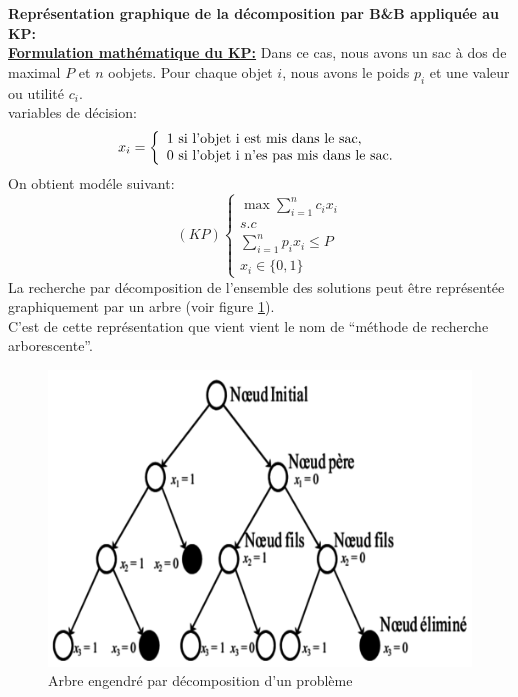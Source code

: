 \documentclass[a4paper,11pt,oneside]{report}
\theoremstyle{plain}
\newcommand{\0}{/ \! \! \! 0}
\theoremstyle{plain}
\begin{document}
  {\bf Repr\'esentation graphique de la d\'ecomposition par B\&B appliqu\'ee au KP:}\\
\underline{\bfseries Formulation math\'ematique du KP:} Dans ce cas, nous avons un sac \`a dos de maximal $P$ et $n$ oobjets. Pour chaque objet $i$, nous avons le poids $p_i$
 et une valeur ou utilit\'e $c_i$.\\
 variables de d\'ecision:
 $$
   x_i = \left \{ \begin{array}{l}
           1 \,\, \textnormal{si l'objet i est mis dans le sac,}\\
           0 \,\, \textnormal{si l'objet i n'es pas mis dans le sac.}
          \end{array}
          \right.
 $$
 On obtient mod\'ele suivant:
 \[
  (KP) \left \{\begin{array}{l}
          \max \displaystyle\sum_{i=1}^n c_i x_i \\
          s.c                        \\
          \displaystyle\sum_{i=1}^n p_i x_i \leq P \\
          x_i \in \{ 0, 1 \}
         \end{array}\right.
 \]
 La recherche par d\'ecomposition de l'ensemble des solutions peut \^etre repr\'esent\'ee graphiquement par un arbre (voir figure \ref{fig1}).\\
 C'est de cette repr\'esentation que vient vient le nom de ``m\'ethode de recherche arborescente''.
  \begin{figure}[h!]
  \begin{center}
  \includegraphics[scale=1]{fig1.png}
  \caption{\label{fig1} Arbre engendr\'e par d\'ecomposition d'un probl\`eme}
  \end{center}
  \end{figure}
\end{document}
